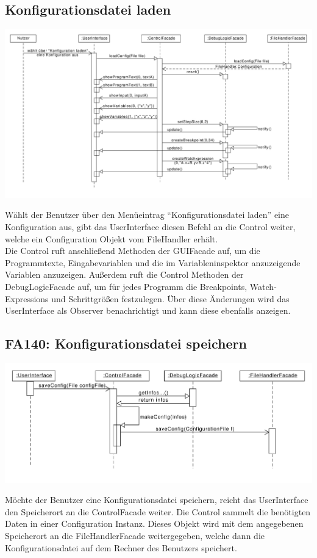 \documentclass[parskip=full]{scrartcl}
\begin{document}
\subsection{Konfigurationsdatei laden}
\begin{center}
\includegraphics[width=1.0\textwidth]{diagrammIdeenUmlet/SequenceDiagrams/seq_loadConfigPDF.pdf}
\end{center}
Wählt der Benutzer über den Menüeintrag \enquote{Konfigurationsdatei laden} eine Konfiguration aus,
gibt das UserInterface diesen Befehl an die Control weiter, welche ein Configuration Objekt vom FileHandler 
erhält. \\
Die Control ruft anschließend Methoden der GUIFacade auf, um die Programmtexte, Eingabevariablen und
die im Variableninspektor anzuzeigende Variablen anzuzeigen. Außerdem ruft die Control
Methoden der DebugLogicFacade auf, um für jedes Programm die Breakpoints, Watch-Expressions und
Schrittgrößen festzulegen. Über diese Änderungen wird das UserInterface als Observer benachrichtigt und kann diese ebenfalls anzeigen.

\newpage
\subsection{FA140: Konfigurationsdatei speichern}
\begin{center}
\includegraphics[width=1.0\textwidth]{diagrammIdeenUmlet/SequenceDiagrams/seq_saveConfigPDF.pdf}
\end{center}
Möchte der Benutzer eine Konfigurationsdatei speichern, reicht das UserInterface den Speicherort
an die ControlFacade weiter. Die Control sammelt die benötigten Daten in einer Configuration Instanz.
Dieses Objekt wird mit dem angegebenen Speicherort an die FileHandlerFacade weitergegeben, welche 
dann die Konfigurationsdatei auf dem Rechner des Benutzers speichert.
\end{document}
